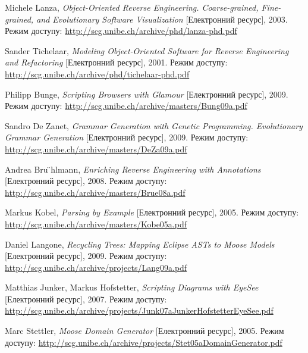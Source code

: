 \documentclass[12pt,a4paper]{article}
\begin{document}
\begin{thebibliography}{9}
Michele Lanza, \emph{Object-Oriented Reverse Engineering. Coarse-grained, Fine-grained, and Evolutionary Software Visualization} [Електронний ресурс], 2003. Режим доступу:
    \url{http://scg.unibe.ch/archive/phd/lanza-phd.pdf} 

Sander Tichelaar, \emph{Modeling Object-Oriented Software for Reverse Engineering and Refactoring} [Електронний ресурс], 2001. Режим доступу:
    \url{http://scg.unibe.ch/archive/phd/tichelaar-phd.pdf} 

Philipp Bunge, \emph{Scripting Browsers with Glamour} [Електронний ресурс], 2009. Режим доступу:
    \url{http://scg.unibe.ch/archive/masters/Bung09a.pdf} 

Sandro De Zanet, \emph{Grammar Generation with
Genetic Programming. Evolutionary Grammar Generation} [Електронний ресурс], 2009. Режим доступу:
    \url{http://scg.unibe.ch/archive/masters/DeZa09a.pdf}

Andrea Bru ̈hlmann, \emph{Enriching Reverse Engineering with Annotations} [Електронний ресурс], 2008. Режим доступу:
    \url{http://scg.unibe.ch/archive/masters/Brue08a.pdf}

Markus Kobel, \emph{Parsing by Example} [Електронний ресурс], 2005. Режим доступу:
    \url{http://scg.unibe.ch/archive/masters/Kobe05a.pdf}

Daniel Langone, \emph{Recycling Trees: Mapping Eclipse ASTs to Moose Models} [Електронний ресурс], 2009. Режим доступу:
    \url{http://scg.unibe.ch/archive/projects/Lang09a.pdf}

Matthias Junker, Markus Hofstetter, \emph{Scripting Diagrams with EyeSee} [Електронний ресурс], 2007. Режим доступу:
    \url{http://scg.unibe.ch/archive/projects/Junk07aJunkerHofstetterEyeSee.pdf}

Marc Stettler, \emph{Moose Domain Generator} [Електронний ресурс], 2005. Режим доступу:
    \url{http://scg.unibe.ch/archive/projects/Stet05aDomainGenerator.pdf}

\end{thebibliography}
\end{document}
